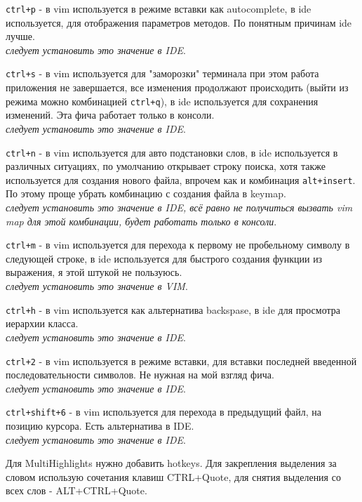\documentclass[a4paper, 12pt]{report}
\begin{document}
\begin{list}{*}{}
	\item \lstinline|ctrl+p| - в vim используется в режиме вставки как autocomplete, в ide используется, для отображения параметров методов. По понятным причинам ide лучше.\\ \textit{следует установить это значение в IDE}.
	\item \lstinline|ctrl+s| - в vim используется для "заморозки" терминала при этом работа приложения не завершается, все изменения продолжают происходить (выйти из режима можно комбинацией \lstinline|ctrl+q|), в ide используется для сохранения изменений. Эта фича работает только в консоли.\\ \textit{следует установить это значение в IDE}.
	\item \lstinline|ctrl+n| - в vim используется для авто подстановки слов, в ide используется в различных ситуациях, по умолчанию открывает строку поиска, хотя также используется для создания нового файла, впрочем как и комбинация \lstinline|alt+insert|. По этому проще убрать комбинацию с создания файла в keymap.\\ \textit{следует установить это значение в IDE, всё равно не получиться вызвать vim map для этой комбинации, будет работать только в консоли}.
	\item \lstinline|ctrl+m| - в vim используется для перехода к первому не пробельному символу в следующей строке, в ide используется для быстрого создания функции из выражения, я этой штукой не пользуюсь.\\ \textit{следует установить это значение в VIM}.
	\item \lstinline|ctrl+h| - в vim используется как альтернатива backspase, в ide для просмотра иерархии класса.\\ \textit{следует установить это значение в IDE}.
	\item \lstinline|ctrl+2| - в vim используется в режиме вставки, для вставки последней введенной последовательности символов. Не нужная на мой взгляд фича.\\ \textit{следует установить это значение в IDE}.
	\item \lstinline|ctrl+shift+6| - в vim используется для перехода в предыдущий файл, на позицию курсора. Есть альтернатива в IDE.\\ \textit{следует установить это значение в IDE}.
\end{list}
Для MultiHighlights нужно добавить hotkeys. Для закрепления выделения за словом использую сочетания клавиш CTRL+Quote, для снятия выделения со всех слов - ALT+CTRL+Quote.\\
\end{document}
